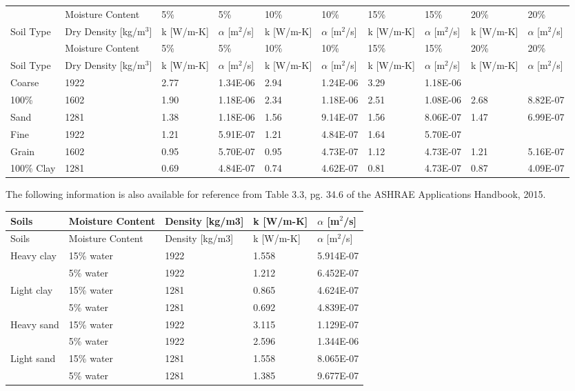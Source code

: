 {\scriptsize
\begin{longtable}[c]{>{\raggedright}p{0.55in}>{\raggedright}p{0.55in}>{\raggedright}p{0.55in}>{\raggedright}p{0.55in}>{\raggedright}p{0.55in}>{\raggedright}p{0.55in}>{\raggedright}p{0.55in}>{\raggedright}p{0.55in}>{\raggedright}p{0.55in}>{\raggedright}p{0.55in}}
\toprule
 & Moisture Content & 5\% & 5\% & 10\% & 10\% & 15\% & 15\% & 20\% & 20\% \tabularnewline
Soil Type & Dry Density  [kg/m\(^3\)] & k  [W/m-K] & \({\alpha}\)   [m\(^2\)/s] & k  [W/m-K] & \({\alpha}\)   [m\(^2\)/s] & k  [W/m-K] & \({\alpha}\)   [m\(^2\)/s] & k  [W/m-K] & \({\alpha}\)   [m\(^2\)/s] \tabularnewline
\midrule
\endfirsthead

\toprule
 & Moisture Content & 5\% & 5\% & 10\% & 10\% & 15\% & 15\% & 20\% & 20\% \tabularnewline
Soil Type & Dry Density  [kg/m\(^3\)] & k  [W/m-K] & \({\alpha}\)   [m\(^2\)/s] & k  [W/m-K] & \({\alpha}\)   [m\(^2\)/s] & k  [W/m-K] & \({\alpha}\)   [m\(^2\)/s] & k  [W/m-K] & \({\alpha}\)   [m\(^2\)/s] \tabularnewline
\midrule
\endhead

Coarse & 1922 & 2.77 & 1.34E-06 & 2.94 & 1.24E-06 & 3.29 & 1.18E-06 &  &  \tabularnewline
100\% & 1602 & 1.90 & 1.18E-06 & 2.34 & 1.18E-06 & 2.51 & 1.08E-06 & 2.68 & 8.82E-07 \tabularnewline
Sand & 1281 & 1.38 & 1.18E-06 & 1.56 & 9.14E-07 & 1.56 & 8.06E-07 & 1.47 & 6.99E-07 \tabularnewline
\midrule
Fine & 1922 & 1.21 & 5.91E-07 & 1.21 & 4.84E-07 & 1.64 & 5.70E-07 &  &  \tabularnewline
Grain & 1602 & 0.95 & 5.70E-07 & 0.95 & 4.73E-07 & 1.12 & 4.73E-07 & 1.21 & 5.16E-07 \tabularnewline
100\% Clay & 1281 & 0.69 & 4.84E-07 & 0.74 & 4.62E-07 & 0.81 & 4.73E-07 & 0.87 & 4.09E-07 \tabularnewline
\bottomrule
\end{longtable}}

The following information is also available for reference from Table 3.3, pg. 34.6 of the ASHRAE Applications Handbook, 2015.

\begin{longtable}[c]{>{\raggedright}p{1.2in}>{\raggedright}p{1.2in}>{\raggedright}p{1.2in}>{\raggedright}p{1.2in}>{\raggedright}p{1.2in}}
\toprule
Soils & Moisture  Content & Density  [kg/m3] & k  [W/m-K] & \({\alpha}\)   [m\(^2\)/s] \tabularnewline
\midrule
\endfirsthead

\toprule
Soils & Moisture  Content & Density  [kg/m3] & k  [W/m-K] & \({\alpha}\)   [m\(^2\)/s] \tabularnewline
\midrule
\endhead

Heavy clay & 15\% water & 1922 & 1.558 & 5.914E-07 \tabularnewline
 & 5\% water & 1922 & 1.212 & 6.452E-07 \tabularnewline
Light clay & 15\% water & 1281 & 0.865 & 4.624E-07 \tabularnewline
 & 5\% water & 1281 & 0.692 & 4.839E-07 \tabularnewline
Heavy sand & 15\% water & 1922 & 3.115 & 1.129E-07 \tabularnewline
 & 5\% water & 1922 & 2.596 & 1.344E-06 \tabularnewline
Light sand & 15\% water & 1281 & 1.558 & 8.065E-07 \tabularnewline
 & 5\% water & 1281 & 1.385 & 9.677E-07 \tabularnewline
\bottomrule
\end{longtable}

